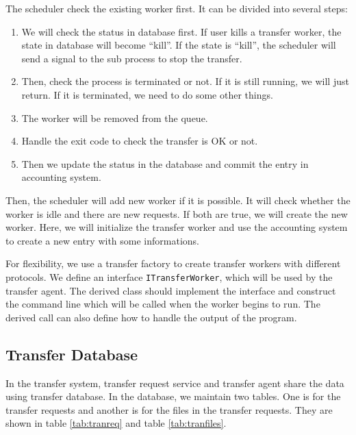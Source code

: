 The scheduler check the existing worker first.
It can be divided into several steps:
\begin{enumerate}
    \item We will check the status in database first.
          If user kills a transfer worker, the state in
          database will become ``kill''.
          If the state is ``kill'', the scheduler will
          send a signal to the sub process to stop the
          transfer.
    \item Then, check the process is terminated or not.
          If it is still running, we will just return.
          If it is terminated, we need to do some other things.
    \item The worker will be removed from the queue.
    \item Handle the exit code to check the transfer is OK or not.
    \item Then we update the status in the database 
          and commit the entry in accounting system.
\end{enumerate}

Then, the scheduler will add new worker if it is possible.
It will check whether the worker is idle and there are new requests.
If both are true, we will create the new worker.
Here, we will initialize the transfer worker and use the accounting
system to create a new entry with some informations.

For flexibility, we use a transfer factory to create transfer workers
with different protocols. 
We define an interface {\tt ITransferWorker},
which will be used by the transfer agent. The derived class should
implement the interface and construct the command line which will 
be called when the worker begins to run.
The derived call can also define how to handle the output of the 
program.

\subsection{Transfer Database}

In the transfer system, transfer request service and transfer agent
share the data using transfer database. In the database, we maintain
two tables. One is for the transfer requests and another is for the 
files in the transfer requests. They are shown in table \ref{tab:tranreq}
and table \ref{tab:tranfiles}.


